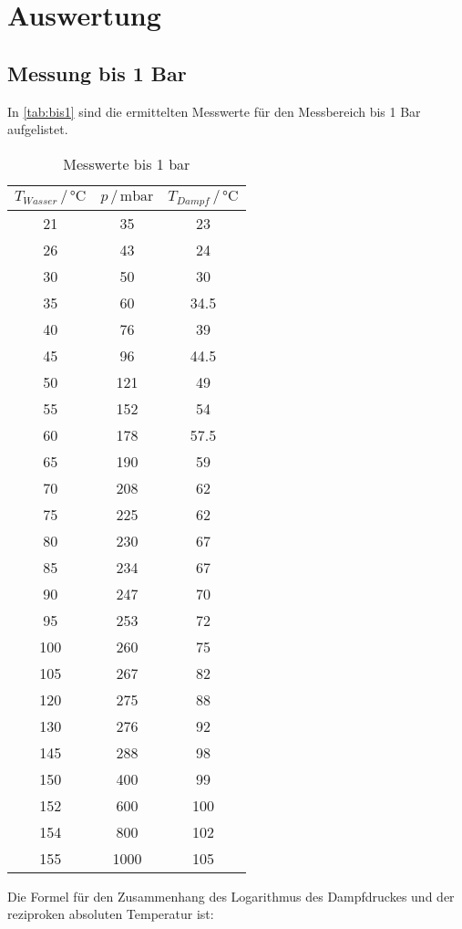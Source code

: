 \section{Auswertung}
\label{sec:Auswertung}
\subsection{Messung bis 1 Bar}
In \autoref{tab:bis1} sind die ermittelten Messwerte für den Messbereich bis 1 Bar aufgelistet.
\begin{table}[H]
  \centering
  \caption{Messwerte bis 1 \si{\bar}}
  \label{tab:bis1}
  \begin{tabular}{ccc}
  \toprule
  $T_{Wasser} \,/\, \si{\celsius}$ & $p \,/\, \si{\milli\bar}$ & $T_{Dampf}\,/\, \si{\celsius}$\\
  \midrule
  21  & 35  & 23   \\
  26  & 43  & 24   \\
  30  & 50  & 30   \\
  35  & 60  & 34.5 \\
  40  & 76  & 39   \\
  45  & 96  & 44.5 \\
  50  & 121 & 49   \\
  55  & 152 & 54   \\
  60  & 178 & 57.5 \\
  65  & 190 & 59   \\
  70  & 208 & 62   \\
  75  & 225 & 62   \\
  80  & 230 & 67   \\
  85  & 234 & 67   \\
  90  & 247 & 70   \\
  95  & 253 & 72   \\
  100 & 260 & 75   \\
  105 & 267 & 82   \\
  120 & 275 & 88   \\
  130 & 276 & 92   \\
  145 & 288 & 98  \\ 
  150 &400 &99\\
  152& 600 &100\\
  154 &800 &102\\
  155 &1000 &105 \\  
  \end{tabular} 
\end{table}
\noindent
Die Formel für den Zusammenhang des Logarithmus des Dampfdruckes und der reziproken absoluten Temperatur ist:
